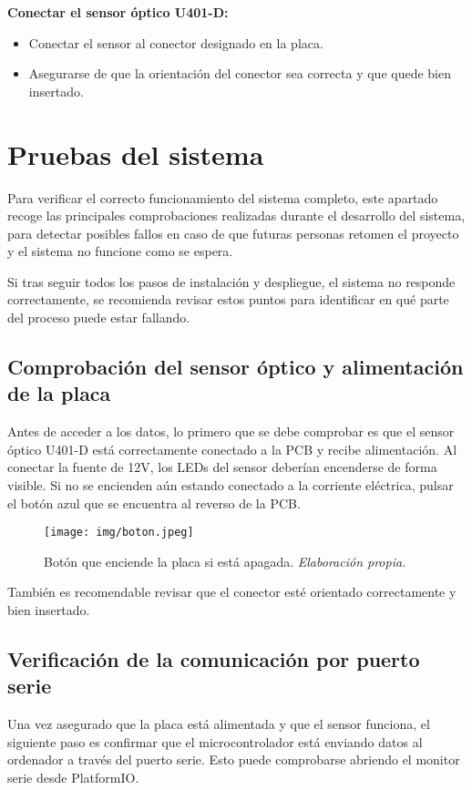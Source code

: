 \textbf{Conectar el sensor óptico U401-D:}
  \begin{itemize}
    \item Conectar el sensor al conector designado en la placa.
    \item Asegurarse de que la orientación del conector sea correcta y que quede bien insertado.
  \end{itemize}


\section{Pruebas del sistema}
Para verificar el correcto funcionamiento del sistema completo, este apartado recoge las principales comprobaciones realizadas durante el desarrollo del sistema, para detectar posibles fallos en caso de que futuras personas retomen el proyecto y el sistema no funcione como se espera. 

Si tras seguir todos los pasos de instalación y despliegue, el sistema no responde correctamente, se recomienda revisar estos puntos para identificar en qué parte del proceso puede estar fallando.


\subsection{Comprobación del sensor óptico y alimentación de la placa}

Antes de acceder a los datos, lo primero que se debe comprobar es que el sensor óptico U401-D está correctamente conectado a la PCB y recibe alimentación. Al conectar la fuente de 12V, los LEDs del sensor deberían encenderse de forma visible. Si no se encienden aún estando conectado a la corriente eléctrica, pulsar el botón azul que se encuentra al reverso de la PCB.
\begin{figure}[H]
    \centering
    \texttt{[image: img/boton.jpeg]}
    \caption{Botón que enciende la placa si está apagada. \textit{Elaboración propia.}}
    \label{fig:botón}
\end{figure}
    
También es recomendable revisar que el conector esté orientado correctamente y bien insertado.

\subsection{Verificación de la comunicación por puerto serie}

Una vez asegurado que la placa está alimentada y que el sensor funciona, el siguiente paso es confirmar que el microcontrolador está enviando datos al ordenador a través del puerto serie. Esto puede comprobarse abriendo el monitor serie desde PlatformIO. 

